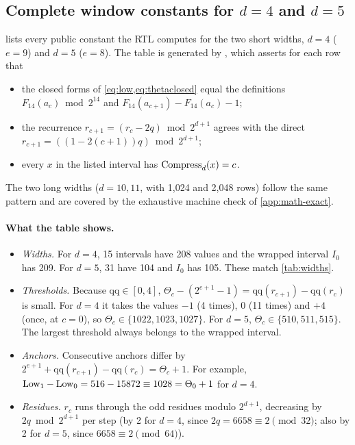 \subsection{Complete window constants for \texorpdfstring{$d = 4$ and $d = 5$}{d = 4 and d = 5}}\label{app:math-windows}
 lists every public constant the RTL computes for the two short widths, $d = 4$ ($e = 9$) and $d = 5$ ($e = 8$). The table is generated by , which asserts for each row that
\begin{itemize}
  \item the closed forms of \cref{eq:low,eq:thetaclosed} equal the definitions $F_{14}(a_c) \bmod 2^{14}$ and $F_{14}(a_{c+1}) - F_{14}(a_c) - 1$;
  \item the recurrence $r_{c+1} = (r_c - 2q) \bmod 2^{d+1}$ agrees with the direct $r_{c+1} = ((1 - 2(c+1))q) \bmod 2^{d+1}$;
  \item every $x$ in the listed interval has $\operatorname{Compress}_d(x) = c$.
\end{itemize}
The two long widths ($d = 10, 11$, with 1,024 and 2,048 rows) follow the same pattern and are covered by the exhaustive machine check of \cref{app:math-exact}.

\paragraph{What the table shows.}
\begin{itemize}
  \item \emph{Widths.} For $d = 4$, 15 intervals have 208 values and the wrapped interval $I_0$ has 209. For $d = 5$, 31 have 104 and $I_0$ has 105. These match \cref{tab:widths}.
  \item \emph{Thresholds.} Because $\mathrm{qq} \in [0, 4]$, $\Theta_c - (2^{e+1} - 1) = \mathrm{qq}(r_{c+1}) - \mathrm{qq}(r_c)$ is small. For $d = 4$ it takes the values $-1$ (4 times), $0$ (11 times) and $+4$ (once, at $c = 0$), so $\Theta_c \in \{1022, 1023, 1027\}$. For $d = 5$, $\Theta_c \in \{510, 511, 515\}$. The largest threshold always belongs to the wrapped interval.
  \item \emph{Anchors.} Consecutive anchors differ by $2^{e+1} + \mathrm{qq}(r_{c+1}) - \mathrm{qq}(r_c) = \Theta_c + 1$. For example, $\mathrm{Low}_1 - \mathrm{Low}_0 = 516 - 15872 \equiv 1028 = \Theta_0 + 1$ for $d = 4$.
  \item \emph{Residues.} $r_c$ runs through the odd residues modulo $2^{d+1}$, decreasing by $2q \bmod 2^{d+1}$ per step (by 2 for $d = 4$, since $2q = 6658 \equiv 2 \pmod{32}$; also by 2 for $d = 5$, since $6658 \equiv 2 \pmod{64}$).
\end{itemize}

